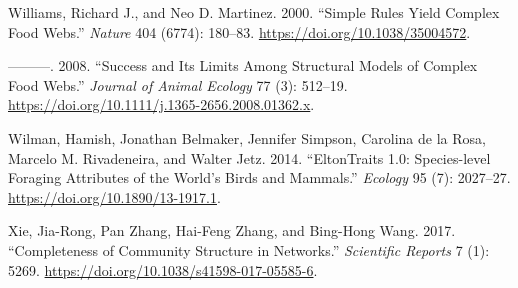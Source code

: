 \documentclass[
  letterpaper,
  DIV=11,
  numbers=noendperiod]{scrartcl}
\newlength{\cslhangindent}
\newenvironment{CSLReferences}[2] %
 {\begin{list}{}{%
  \setlength{\itemindent}{0pt}
  \setlength{\leftmargin}{0pt}
  \setlength{\parsep}{0pt}
  \ifodd #1
   \setlength{\leftmargin}{\cslhangindent}
   \setlength{\itemindent}{-1\cslhangindent}
  \fi
  \setlength{\itemsep}{#2\baselineskip}}}
 {\end{list}}
\begin{document}
\begin{CSLReferences}{1}{0}
Williams, Richard J., and Neo D. Martinez. 2000. {``Simple Rules Yield
Complex Food Webs.''} \emph{Nature} 404 (6774): 180--83.
\url{https://doi.org/10.1038/35004572}.

---------. 2008. {``Success and Its Limits Among Structural Models of
Complex Food Webs.''} \emph{Journal of Animal Ecology} 77 (3): 512--19.
\url{https://doi.org/10.1111/j.1365-2656.2008.01362.x}.

Wilman, Hamish, Jonathan Belmaker, Jennifer Simpson, Carolina de la
Rosa, Marcelo M. Rivadeneira, and Walter Jetz. 2014. {``{EltonTraits}
1.0: {Species-level} Foraging Attributes of the World's Birds and
Mammals.''} \emph{Ecology} 95 (7): 2027--27.
\url{https://doi.org/10.1890/13-1917.1}.

Xie, Jia-Rong, Pan Zhang, Hai-Feng Zhang, and Bing-Hong Wang. 2017.
{``Completeness of {Community Structure} in {Networks}.''}
\emph{Scientific Reports} 7 (1): 5269.
\url{https://doi.org/10.1038/s41598-017-05585-6}.

\end{CSLReferences}
\end{document}
